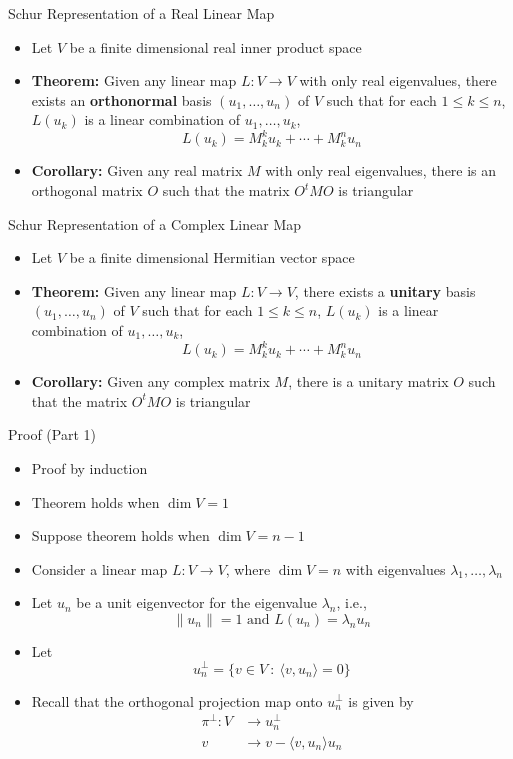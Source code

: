 \documentclass[usenames,dvipsnames,10pt]{beamer}
\begin{document}
\begin{frame}
  {Schur Representation of a Real Linear Map}

  \begin{itemize}
  \item Let $V$ be a finite dimensional real inner product space
  \item {\bf Theorem:} Given any linear map $L: V \rightarrow V$ with only real eigenvalues, there exists an {\bf orthonormal} basis $(u_1, \dots, u_n)$ of $V$ such that for each $1 \le k \le n$, $L(u_k)$ is a linear combination of $u_1, \dots, u_k$,
    \[
      L(u_k) = M_k^ku_k + \cdots + M_k^nu_n
    \]
  \item {\bf Corollary:} Given any real matrix $M$ with only real eigenvalues, there is an orthogonal matrix $O$ such that the matrix $O^tMO$ is triangular
  \end{itemize}
\end{frame}

\begin{frame}
  {Schur Representation of a Complex Linear Map}

  \begin{itemize}
  \item Let $V$ be a finite dimensional Hermitian vector space
  \item {\bf Theorem:} Given any linear map $L: V \rightarrow V$, there exists a {\bf unitary} basis $(u_1, \dots, u_n)$ of $V$ such that for each $1 \le k \le n$, $L(u_k)$ is a linear combination of $u_1, \dots, u_k$,
    \[
      L(u_k) = M_k^ku_k + \cdots + M_k^nu_n
    \]
  \item {\bf Corollary:} Given any complex matrix $M$, there is a unitary matrix $O$ such that the matrix $O^tMO$ is triangular
  \end{itemize}
\end{frame}

\begin{frame}
  {Proof (Part 1)}

  \begin{itemize}
  \item Proof by induction
  \item Theorem holds when $\dim V = 1$
  \item Suppose theorem holds when $\dim V = n-1$
  \item Consider a linear map $L: V \rightarrow V$, where $\dim V = n$ with eigenvalues $\lambda_1, \dots, \lambda_n$
  \item Let $u_n$ be a unit eigenvector for the eigenvalue $\lambda_n$, i.e.,
    \[
      \|u_n\| = 1\text{ and }L(u_n) = \lambda_n u_n
    \]
  \item Let
    \[
      u_n^\perp = \{ v\in V\ :\ \langle v,u_n\rangle = 0 \}
    \]
  \item Recall that the orthogonal projection map onto $u_n^\perp$ is given by
    \begin{align*}
      \pi^\perp: V &\rightarrow u_n^\perp\\
      v &\rightarrow v - \langle v,u_n\rangle u_n
    \end{align*}
  \end{itemize}
\end{frame}
\end{document}
